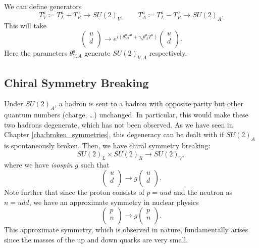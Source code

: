 We can define generators
\begin{equation}
  T_V^a \coloneqq T_L^a + T_R^a \to SU(2)_V, \qquad
  T_A^a \coloneqq T_L^a - T_R^a \to SU(2)_A.
\end{equation}
This will take
\begin{equation}
  \begin{pmatrix}
  u \\
  d \\
  \end{pmatrix} \to e^{i (\theta^{a}_V T^{a} + \gamma_5 \theta^{a}_{A} T^{a})} 
  \begin{pmatrix}
  u \\
  d \\
  \end{pmatrix}.
\end{equation}
Here the parameters $\theta_{V, A}^{a}$ generate $SU(2)_{V, A}$ respectively.

\subsection{Chiral Symmetry Breaking}%
\label{sub:chiral_symmetry_breaking}

Under $SU(2)_A$, a hadron is sent to a hadron with opposite parity but other quantum numbers (charge, \dots) unchanged. In particular, this would make these two hadrons degenerate, which has not been observed. As we have seen in Chapter \ref{cha:broken_symmetries}, this degeneracy can be dealt with if $SU(2)_A$ is spontaneously broken.
Then, we have chiral symmetry breaking:
\begin{equation}
  SU(2)_L \times SU(2)_R \to SU(2)_V,
\end{equation}
where we have \emph{isospin} $g$ such that
\begin{equation}
  \begin{pmatrix}
  u \\
  d \\
  \end{pmatrix} \to g
  \begin{pmatrix}
  u \\
  d \\
  \end{pmatrix}.
\end{equation}
Note further that since the proton consists of $p = u u d$ and the neutron as $n = u d d$, we have an approximate symmetry in nuclear physics
\begin{equation}
  \begin{pmatrix}
  p \\
  n \\
  \end{pmatrix} \to g
  \begin{pmatrix}
  p \\
  n \\
  \end{pmatrix}.
\end{equation}
This approximate symmetry, which is observed in nature, fundamentally arises since the masses of the up and down quarks are very small.

